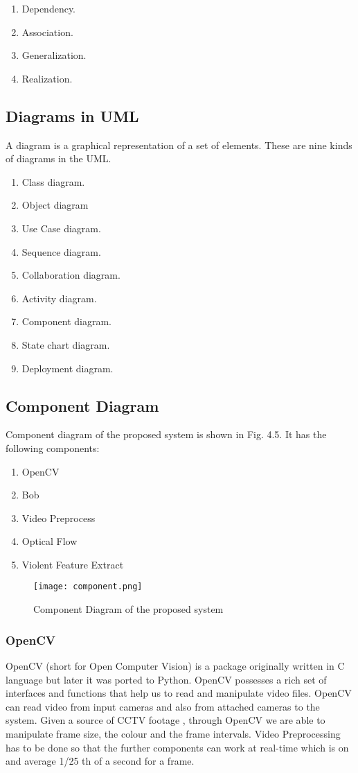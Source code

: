 \begin{enumerate}
	\item Dependency.
	\item Association.
	\item Generalization.
	\item Realization.
\end{enumerate}
\subsection{Diagrams in UML}
A diagram is a graphical representation of a set of elements. These are nine kinds of diagrams in the UML.
\begin{enumerate}
	\item Class diagram.                 
\item  Object diagram                
\item  Use Case diagram.               
\item  Sequence diagram.             
\item  Collaboration diagram.
\item  Activity diagram.
\item  Component diagram.
\item  State chart diagram.
\item  Deployment diagram.

\end{enumerate}
\subsection{Component Diagram}
Component diagram of the proposed system is shown in Fig. 4.5. It has the following components:
\begin{enumerate}
	\item OpenCV
	\item Bob
	\item Video Preprocess
	\item Optical Flow
	\item Violent Feature Extract
\end{enumerate}
\begin{center}
\begin{figure}[H]
\centering
\texttt{[image: component.png]}
\caption{Component Diagram of the proposed system}
\end{figure}
\end{center}
\subsubsection{OpenCV}
OpenCV (short for Open Computer Vision) is a package originally written in C language but later it was ported to Python. OpenCV possesses a rich set of interfaces and functions  that help us to read and manipulate video files. OpenCV can read video from input cameras and also from attached cameras to the system. Given a source of CCTV footage , through OpenCV we are able to manipulate frame size, the colour and the frame intervals. Video Preprocessing has to be done so that the further components can work at real-time which is on and average 1/25 th of a second for a frame.
